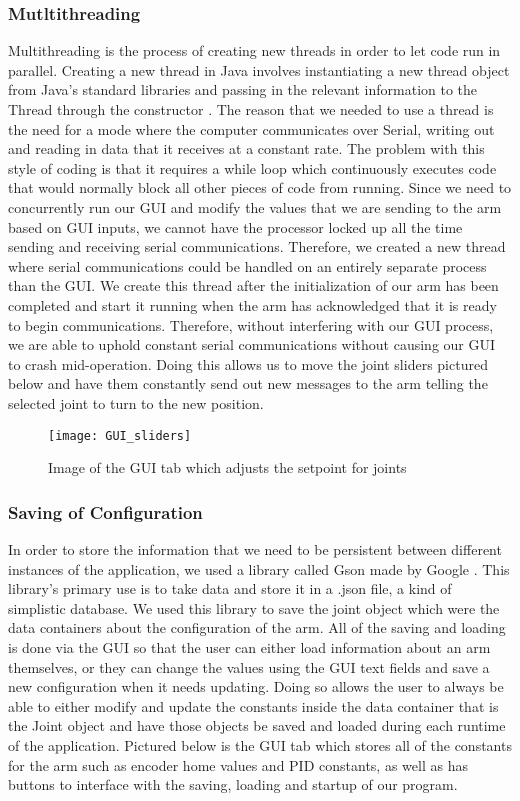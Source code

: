 \subsubsection{Mutltithreading}
Multithreading is the process of creating new threads in order to let code run in parallel. Creating a new thread in Java involves instantiating a new thread object from Java's standard libraries and passing in the relevant information to the Thread through the constructor \cite{ThreadJava}. The reason that we needed to use a thread is the need for a mode where the computer communicates over Serial, writing out and reading in data that it receives at a constant rate. The problem with this style of coding is that it requires a while loop which continuously executes code that would normally block all other pieces of code from running. Since we need to concurrently run our GUI and modify the values that we are sending to the arm based on GUI inputs, we cannot have the processor locked up all the time sending and receiving serial communications. Therefore, we created a new thread where serial communications could be handled on an entirely separate process than the GUI. We create this thread after the initialization of our arm has been completed and start it running when the arm has acknowledged that it is ready to begin communications. Therefore, without interfering with our GUI process, we are able to uphold constant serial communications without causing our GUI to crash mid-operation. Doing this allows us to move the joint sliders pictured below and have them constantly send out new messages to the arm telling the selected joint to turn to the new position. 

\begin{figure}[H]
	\centering
	\texttt{[image: GUI\_sliders]}
	\caption{Image of the GUI tab which adjusts the setpoint for joints}
	\label{fig:GUI_Sliders}
\end{figure}


\subsubsection{Saving of Configuration}
In order to store the information that we need to be persistent between different instances of the application, we used a library called Gson made by Google \cite{gson}. This library's primary use is to take data and store it in a .json file, a kind of simplistic database.  We used this library to save the joint object which were the data containers about the configuration of the arm. All of the saving and loading is done via the GUI so that the user can either load information about an arm themselves, or they can change the values using the GUI text fields and save a new configuration when it needs updating. Doing so allows the user to always be able to either modify and update the constants inside the data container that is the Joint object and have those objects be saved and loaded during each runtime of the application. Pictured below is the GUI tab which stores all of the constants for the arm such as encoder home values and PID constants, as well as has buttons to interface with the saving, loading and startup of our program.

